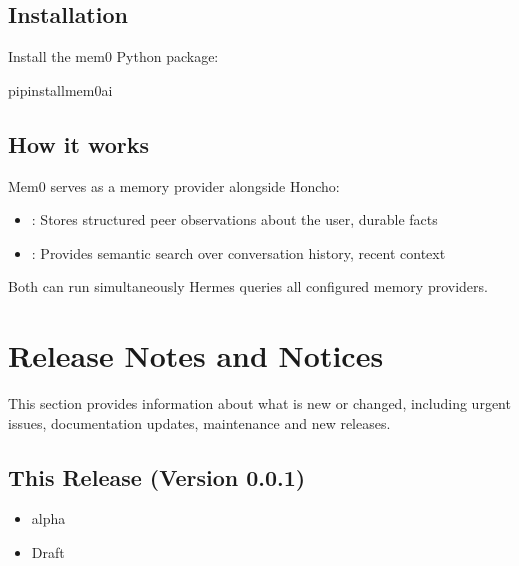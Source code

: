 \documentclass[a4paper,10pt,english,openany]{sphinxmanual}
\begin{document}
\section{Installation}
\label{\detokenize{mem0-memory-plugin:installation}}
\sphinxAtStartPar
Install the mem0 Python package:

\begin{sphinxVerbatim}[commandchars=\\\{\}]
pipinstallmem0ai
\end{sphinxVerbatim}


\section{How it works}
\label{\detokenize{mem0-memory-plugin:how-it-works}}
\sphinxAtStartPar
Mem0 serves as a  memory provider alongside Honcho:
\begin{itemize}
\item {} 
\sphinxAtStartPar
{}: Stores structured peer observations about the user, durable facts

\item {} 
\sphinxAtStartPar
{}: Provides semantic search over conversation history, recent context

\end{itemize}

\sphinxAtStartPar
Both can run simultaneously \sphinxhyphen{} Hermes queries all configured memory providers.

\sphinxstepscope


\chapter{Release Notes and Notices}
\label{\detokenize{releasenotes:release-notes-and-notices}}\label{\detokenize{releasenotes::doc}}
\sphinxAtStartPar
This section provides information about what is new or changed, including urgent issues, documentation updates, maintenance and new releases.


\section{This Release (Version 0.0.1)}
\label{\detokenize{releasenotes:this-release-version-0-0-1}}\begin{itemize}
\item {} 
\sphinxAtStartPar
{} \sphinxhyphen{} alpha

\item {} 
\sphinxAtStartPar
{} \sphinxhyphen{} Draft

\end{itemize}
\end{document}
